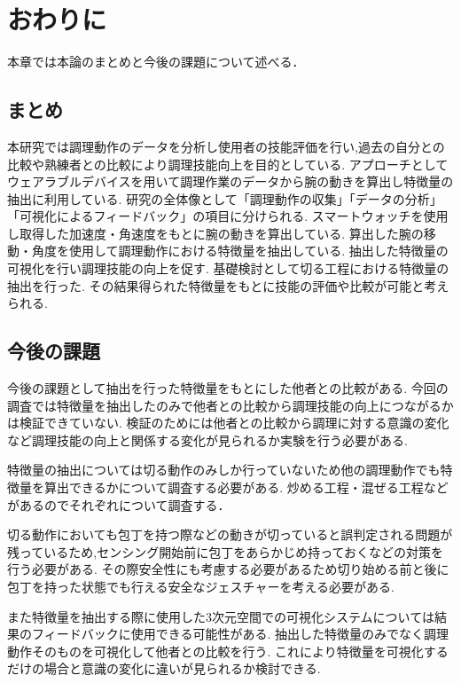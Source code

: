 \section{おわりに}
本章では本論のまとめと今後の課題について述べる．
\subsection{まとめ}
本研究では調理動作のデータを分析し使用者の技能評価を行い,過去の自分との比較や熟練者との比較により調理技能向上を目的としている.
アプローチとしてウェアラブルデバイスを用いて調理作業のデータから腕の動きを算出し特徴量の抽出に利用している.
研究の全体像として「調理動作の収集」「データの分析」「可視化によるフィードバック」の項目に分けられる.
スマートウォッチを使用し取得した加速度・角速度をもとに腕の動きを算出している.
算出した腕の移動・角度を使用して調理動作における特徴量を抽出している.
抽出した特徴量の可視化を行い調理技能の向上を促す.
基礎検討として切る工程における特徴量の抽出を行った.
その結果得られた特徴量をもとに技能の評価や比較が可能と考えられる.
\subsection{今後の課題}
今後の課題として抽出を行った特徴量をもとにした他者との比較がある.
今回の調査では特徴量を抽出したのみで他者との比較から調理技能の向上につながるかは検証できていない.
検証のためには他者との比較から調理に対する意識の変化など調理技能の向上と関係する変化が見られるか実験を行う必要がある.

特徴量の抽出については切る動作のみしか行っていないため他の調理動作でも特徴量を算出できるかについて調査する必要がある.
炒める工程・混ぜる工程などがあるのでそれぞれについて調査する．


切る動作においても包丁を持つ際などの動きが切っていると誤判定される問題が残っているため,センシング開始前に包丁をあらかじめ持っておくなどの対策を行う必要がある.
その際安全性にも考慮する必要があるため切り始める前と後に包丁を持った状態でも行える安全なジェスチャーを考える必要がある.

また特徴量を抽出する際に使用した3次元空間での可視化システムについては結果のフィードバックに使用できる可能性がある.
抽出した特徴量のみでなく調理動作そのものを可視化して他者との比較を行う.
これにより特徴量を可視化するだけの場合と意識の変化に違いが見られるか検討できる.